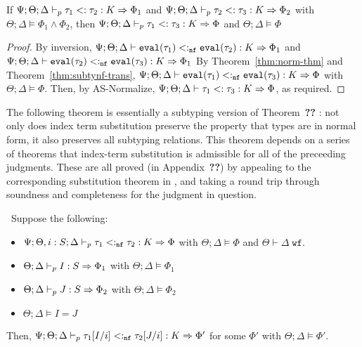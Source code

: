 \begin{theorem}
\label{thm:subty-trans}
If $\Psi ; \Theta ; \Delta \vdash_p \tau_1 <: \tau_2 : K \Rightarrow \Phi_1$ and $\Psi ; \Theta ; \Delta \vdash_p \tau_2 <: \tau_3 : K \Rightarrow \Phi_2$ with $\Theta ; \Delta \vDash \Phi_1 \wedge \Phi_2$, then $\Psi ; \Theta ; \Delta \vdash_p \tau_1 <: \tau_3 : K \Rightarrow \Phi$ and $\Theta ; \Delta \vDash \Phi$
\end{theorem}
\begin{proof}
By inversion, $\Psi ; \Theta ; \Delta \vdash \texttt{eval}(\tau_1) <:_{\texttt{nf}} \texttt{eval}(\tau_2) : K \Rightarrow \Phi_1$ and $\Psi ; \Theta ; \Delta \vdash \texttt{eval}(\tau_2) <:_{\texttt{nf}} \texttt{eval}(\tau_3) : K \Rightarrow \Phi_1$ By Theorem~\ref{thm:norm-thm} and Theorem~\ref{thm:subtynf-trans}, 
$\Psi ; \Theta ; \Delta \vdash \texttt{eval}(\tau_1) <:_{\texttt{nf}} \texttt{eval}(\tau_3) : K \Rightarrow \Phi$ with $\Theta ; \Delta \vDash \Phi$. Then, by AS-Normalize,
$\Psi ; \Theta ; \Delta \vdash \tau_1 <: \tau_3 : K \Rightarrow \Phi$, as required.
\end{proof}

The following theorem is essentially a subtyping version of Theorem~\textbf{??} : not only does index term substitution preserve the property that types are in normal form, it also preserves all subtyping relations. This theorem depends on a series of theorems that index-term substitution is admissible for all of the preceeding judgments. These are all proved (in Appendix~\textbf{??}) by appealing to the corresponding substitution theorem in \dlambdaamor, and taking a round trip through soundness and completeness for the judgment in question.

\begin{theorem}
\label{thm:subtynf-idx-subst}
~Suppose the following:
 \begin{itemize}
   \item $\Psi ; \Theta, i : S ; \Delta \vdash_p \tau_1 <:_{\texttt{nf}} \tau_2 : K \Rightarrow \Phi$ with $\Theta ; \Delta \vDash \Phi$ and $\Theta \vdash \Delta \; \texttt{wf}$.
   \item $\Theta ; \Delta \vdash_p I : S \Rightarrow \Phi_1$ with $\Theta ; \Delta \vDash \Phi_1$
   \item $\Theta ; \Delta \vdash_p J : S \Rightarrow \Phi_2$ with $\Theta ; \Delta \vDash \Phi_2$ 
   \item $\Theta ; \Delta \vDash I = J$
 \end{itemize}
 Then, $\Psi ; \Theta ; \Delta \vdash_p \tau_1[I/i] <:_{\texttt{nf}} \tau_2[J/i] : K \Rightarrow \Phi'$ for some $\Phi'$ with $\Theta ; \Delta \vDash \Phi'$.
\end{theorem}

